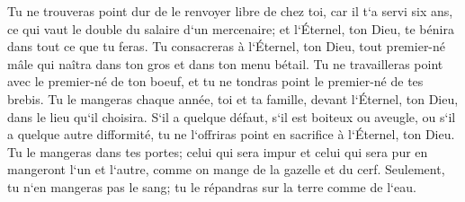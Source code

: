 \verse Tu ne trouveras point dur de le renvoyer libre de chez toi, car il t`a servi six ans, ce qui vaut le double du salaire d`un mercenaire; et l`Éternel, ton Dieu, te bénira dans tout ce que tu feras. 
\verse Tu consacreras à l`Éternel, ton Dieu, tout premier-né mâle qui naîtra dans ton gros et dans ton menu bétail. Tu ne travailleras point avec le premier-né de ton boeuf, et tu ne tondras point le premier-né de tes brebis. 
\verse Tu le mangeras chaque année, toi et ta famille, devant l`Éternel, ton Dieu, dans le lieu qu`il choisira. 
\verse S`il a quelque défaut, s`il est boiteux ou aveugle, ou s`il a quelque autre difformité, tu ne l`offriras point en sacrifice à l`Éternel, ton Dieu. 
\verse Tu le mangeras dans tes portes; celui qui sera impur et celui qui sera pur en mangeront l`un et l`autre, comme on mange de la gazelle et du cerf. 
\verse Seulement, tu n`en mangeras pas le sang; tu le répandras sur la terre comme de l`eau. 

\chapter{}

